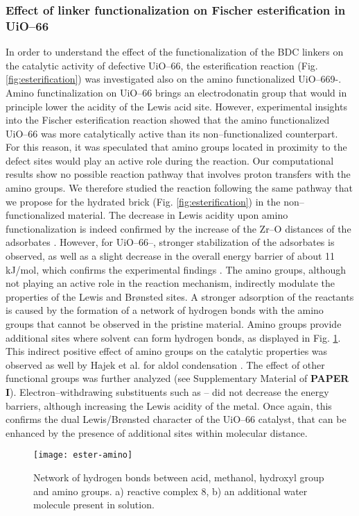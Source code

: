 \subsubsection*{Effect of linker functionalization on Fischer esterification in UiO--66}
In order to understand the effect of the functionalization of the BDC linkers on the catalytic activity of defective UiO--66, the esterification reaction (Fig. \ref{fig:esterification}) was investigated also on the amino functionalized UiO--669-. Amino functinalization on UiO--66 brings an electrodonatin group that would in principle lower the acidity of the Lewis acid site. However, experimental insights into the Fischer esterification reaction showed that the amino functionalized UiO--66 was more catalytically active than its non--functionalized counterpart. For this reason, it was speculated that amino groups located in proximity to the defect sites would play an active role during the reaction. Our computational results show no possible reaction pathway that involves proton transfers with the amino groups. We therefore studied the reaction following the same pathway that we propose for the hydrated brick (Fig. \ref{fig:esterification}) in the non--functionalized material. 
\npar
The decrease in Lewis acidity upon amino functionalization is indeed confirmed by the increase of the Zr--O distances of the adsorbates \cite{vermoortele2012electronic}. However, for UiO--66--, stronger stabilization of the adsorbates is observed, as well as a slight decrease in the overall energy barrier of about 11 kJ/mol, which confirms the experimental findings \cite{cirujano2015conversion, cirujano2015zirconium}. The amino groups, although not playing an active role in the reaction mechanism, indirectly modulate the properties of the Lewis and Br\o{}nsted sites. A stronger adsorption of the reactants is caused by the formation of a network of hydrogen bonds with the amino groups that cannot be observed in the pristine material. Amino groups provide additional sites where solvent can form hydrogen bonds, as displayed in Fig. \ref{fig:ester-amino}. This indirect positive effect of amino groups on the catalytic properties was observed as well by Hajek et al. for aldol condensation \cite{vandichel2015active}. The effect of other functional groups was further analyzed (see Supplementary Material of \textbf{PAPER I}). Electron--withdrawing substituents such as -- did not decrease the energy barriers, although increasing the Lewis acidity of the metal. Once again, this confirms the dual Lewis/Br\o{}nsted character of the UiO--66 catalyst, that can be enhanced by the presence of additional sites within molecular distance. 
\begin{figure}[!htbp]
	\centering
	\texttt{[image: ester-amino]}
	\caption{Network of hydrogen bonds between acid, methanol, hydroxyl group and amino groups. a) reactive complex 8, b) an additional water molecule present in solution.}
	\label{fig:ester-amino}
\end{figure}

